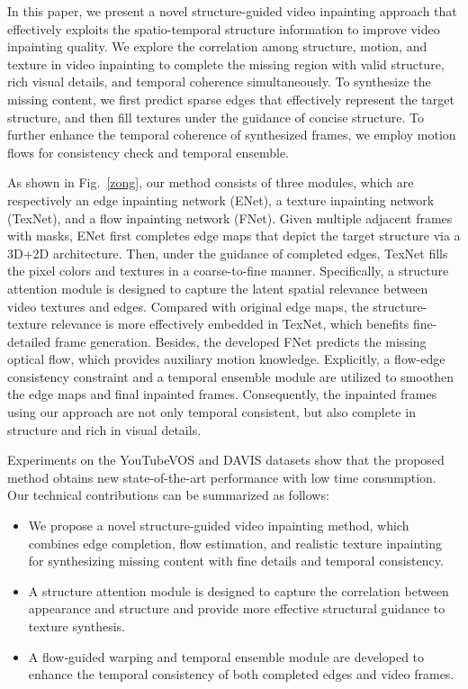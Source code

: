 In this paper, we present a novel structure-guided video inpainting approach that effectively exploits the spatio-temporal structure information to improve video inpainting quality.  
We explore the correlation among structure, motion, and texture in video inpainting to complete the missing region with valid structure, rich visual details, and temporal coherence simultaneously.
%
To synthesize the missing content, we first predict sparse edges that effectively represent the target structure, and then fill textures under the guidance of concise structure.
To further enhance the temporal coherence of synthesized frames, we employ motion flows for consistency check and temporal ensemble. 



As shown in Fig.~\ref{zong}, our method consists of three modules, which are respectively an edge inpainting network (ENet), a texture inpainting network (TexNet), and a flow inpainting network (FNet).
%
Given multiple adjacent frames with masks, ENet first completes edge maps that depict the target structure via a 3D+2D architecture. 
Then, under the guidance of completed edges, TexNet fills the pixel colors and textures in a coarse-to-fine manner.
Specifically, a structure attention module is designed to capture the latent spatial relevance between video textures and edges.
Compared with original edge maps, the structure-texture relevance is more effectively embedded in TexNet, which benefits fine-detailed frame generation.
Besides, the developed FNet predicts the missing optical flow, which provides auxiliary motion knowledge. 
Explicitly, a flow-edge consistency constraint and a temporal ensemble module are utilized to smoothen the edge maps and final inpainted frames. 
Consequently, the inpainted frames using our approach are not only temporal consistent, but also complete in structure and rich in visual details.


%
Experiments on the YouTubeVOS and DAVIS datasets show that the proposed method obtains new state-of-the-art performance with low time consumption.
%
Our technical contributions can be summarized as follows:
\begin{itemize}
	\item We propose a novel structure-guided video inpainting method, which combines edge completion, flow estimation, and realistic texture inpainting for synthesizing missing content with fine details and temporal consistency.
	\item A structure attention module is designed to capture the correlation between appearance and structure and provide more effective structural guidance to texture synthesis.
	\item A flow-guided warping and temporal ensemble module are developed to enhance the temporal consistency of both completed edges and video frames.   
\end{itemize}





